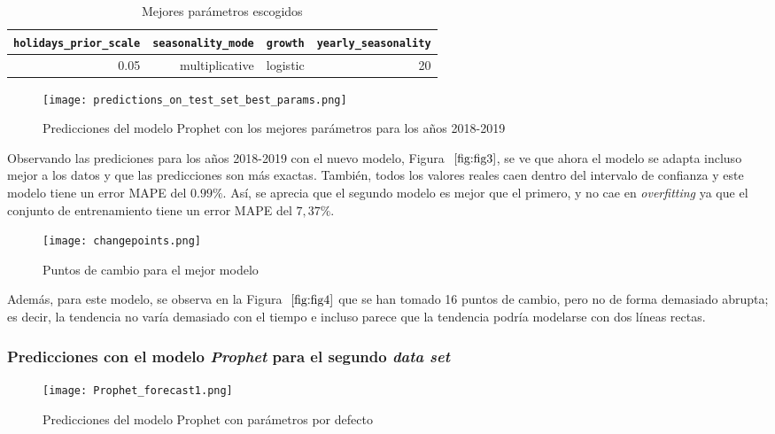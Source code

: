 \documentclass[12pt,twoside]{article}
\begin{document}
\begin{table}[ht] 
\centering
\begin{tabular}{rrrr} 
  \hline
 \texttt{holidays\_prior\_scale} & \texttt{seasonality\_mode} & \texttt{growth} & \texttt{yearly\_seasonality} \\ 
  \hline
0.05 & multiplicative & logistic & 20 \\ 
   \hline
\end{tabular}
\caption{Mejores parámetros escogidos} \label{tab:01}
\end{table}

\begin{figure}[h]
    \centering
    \texttt{[image: predictions\_on\_test\_set\_best\_params.png]}
    \caption{Predicciones del modelo Prophet con los mejores parámetros para los años 2018-2019} 
    \label{fig:fig3}
\end{figure}

Observando las prediciones para los años 2018-2019 con el nuevo modelo, Figura $~\ref{fig:fig3}$, se ve que ahora el modelo se adapta incluso mejor a los datos y que las predicciones son más exactas. También, todos los valores reales caen dentro del intervalo de confianza y este modelo tiene un error MAPE del $0.99\%$. Así, se aprecia que el segundo modelo es mejor que el primero, y no cae en \textit{overfitting} ya que el conjunto de entrenamiento tiene un error MAPE del $7,37\%$.

\begin{figure}[h]
    \centering
    \texttt{[image: changepoints.png]}
    \caption{Puntos de cambio para el mejor modelo} 
    \label{fig:fig4}
\end{figure}

Además, para este modelo, se observa en la Figura $~\ref{fig:fig4}$ que se han tomado 16 puntos de cambio, pero no de forma demasiado abrupta; es decir, la tendencia no varía demasiado con el tiempo e incluso parece que la tendencia podría modelarse con dos líneas rectas. 

\subsubsection{Predicciones con el modelo \textit{Prophet} para el segundo \textit{data set}}\label{sec:9}

\begin{figure}[h]
    \centering
    \texttt{[image: Prophet\_forecast1.png]}
    \caption{Predicciones del modelo Prophet con parámetros por defecto} 
    \label{fig:fig5}
\end{figure}
\end{document}
